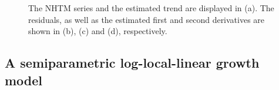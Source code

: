 \begin{figure}[htbp]
	\caption{\label{fig:ex1} The NHTM series and the estimated trend are displayed in (a). The residuals, as well as the estimated first and second derivatives are shown in (b), (c) and (d), respectively.}
\end{figure}

\subsection{A semiparametric log-local-linear growth model}

